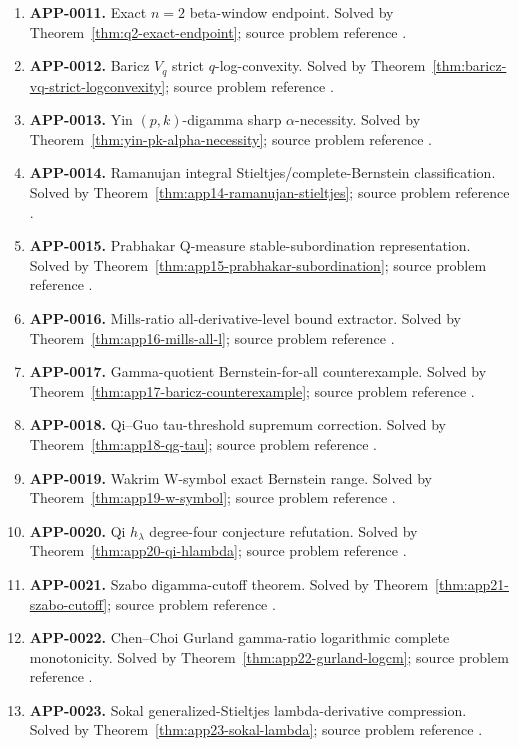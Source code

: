 \documentclass[11pt]{article}
\numberwithin{equation}{section}
\theoremstyle{definition}
\theoremstyle{remark}
\newcommand{\1}{\mathbf 1}
\begin{document}
\begin{enumerate}
\item \textbf{APP-0011.} Exact \(n=2\) beta-window endpoint.  Solved by Theorem~\ref{thm:q2-exact-endpoint}; source problem reference \cite{qi-lim-nantomah-polygamma}.
\item \textbf{APP-0012.} Baricz \(V_q\) strict \(q\)-log-convexity.  Solved by Theorem~\ref{thm:baricz-vq-strict-logconvexity}; source problem reference \cite{baricz-turan-thesis}.
\item \textbf{APP-0013.} Yin \((p,k)\)-digamma sharp \(\alpha\)-necessity.  Solved by Theorem~\ref{thm:yin-pk-alpha-necessity}; source problem reference \cite{yin-pk-digamma}.
\item \textbf{APP-0014.} Ramanujan integral Stieltjes/complete-Bernstein classification.  Solved by Theorem~\ref{thm:app14-ramanujan-stieltjes}; source problem reference \cite{mishra-swaminathan-ramanujan}.
\item \textbf{APP-0015.} Prabhakar Q-measure stable-subordination representation.  Solved by Theorem~\ref{thm:app15-prabhakar-subordination}; source problem reference \cite{sibisi-prabhakar}.
\item \textbf{APP-0016.} Mills-ratio all-derivative-level bound extractor.  Solved by Theorem~\ref{thm:app16-mills-all-l}; source problem reference \cite{from-mills}.
\item \textbf{APP-0017.} Gamma-quotient Bernstein-for-all counterexample.  Solved by Theorem~\ref{thm:app17-baricz-counterexample}; source problem reference \cite{baricz-turan}.
\item \textbf{APP-0018.} Qi--Guo tau-threshold supremum correction.  Solved by Theorem~\ref{thm:app18-qg-tau}; source problem reference \cite{qi-guo-2004}.
\item \textbf{APP-0019.} Wakrim W-symbol exact Bernstein range.  Solved by Theorem~\ref{thm:app19-w-symbol}; source problem reference \cite{wakrim-w}.
\item \textbf{APP-0020.} Qi \(h_\lambda\) degree-four conjecture refutation.  Solved by Theorem~\ref{thm:app20-qi-hlambda}; source problem reference \cite{qi-hlambda}.
\item \textbf{APP-0021.} Szabo digamma-cutoff theorem.  Solved by Theorem~\ref{thm:app21-szabo-cutoff}; source problem reference \cite{szabo-cm}.
\item \textbf{APP-0022.} Chen--Choi Gurland gamma-ratio logarithmic complete monotonicity.  Solved by Theorem~\ref{thm:app22-gurland-logcm}; source problem reference \cite{chen-choi-gurland}.
\item \textbf{APP-0023.} Sokal generalized-Stieltjes lambda-derivative compression.  Solved by Theorem~\ref{thm:app23-sokal-lambda}; source problem reference \cite{sokal-gs}.
\end{enumerate}
\end{document}
